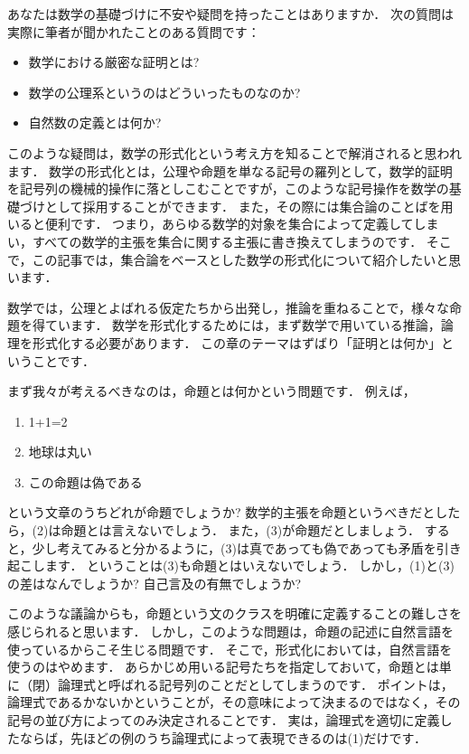 \documentclass[./main]{subfiles}
\begin{document}


あなたは数学の基礎づけに不安や疑問を持ったことはありますか．
次の質問は実際に筆者が聞かれたことのある質問です：
\begin{itemize}
\item 数学における厳密な証明とは?
\item 数学の公理系というのはどういったものなのか?
\item 自然数の定義とは何か?
\end{itemize}
このような疑問は，数学の形式化という考え方を知ることで解消されると思われます．
数学の形式化とは，公理や命題を単なる記号の羅列として，数学的証明を記号列の機械的操作に落としこむことですが，このような記号操作を数学の基礎づけとして採用することができます．
また，その際には集合論のことばを用いると便利です．
つまり，あらゆる数学的対象を集合によって定義してしまい，すべての数学的主張を集合に関する主張に書き換えてしまうのです．
そこで，この記事では，集合論をベースとした数学の形式化について紹介したいと思います．


数学では，公理とよばれる仮定たちから出発し，推論を重ねることで，様々な命題を得ています．
数学を形式化するためには，まず数学で用いている推論，論理を形式化する必要があります．
この章のテーマはずばり「証明とは何か」ということです．


まず我々が考えるべきなのは，命題とは何かという問題です．
例えば，
\begin{enumerate}
\item 1+1=2
\item 地球は丸い
\item この命題は偽である
\end{enumerate}
という文章のうちどれが命題でしょうか?
数学的主張を命題というべきだとしたら，(2)は命題とは言えないでしょう．
また，(3)が命題だとしましょう．
すると，少し考えてみると分かるように，(3)は真であっても偽であっても矛盾を引き起こします．
ということは(3)も命題とはいえないでしょう．
しかし，(1)と(3)の差はなんでしょうか?
自己言及の有無でしょうか?

このような議論からも，命題という文のクラスを明確に定義することの難しさを感じられると思います．
しかし，このような問題は，命題の記述に自然言語を使っているからこそ生じる問題です．
そこで，形式化においては，自然言語を使うのはやめます．
あらかじめ用いる記号たちを指定しておいて，命題とは単に（閉）論理式と呼ばれる記号列のことだとしてしまうのです．
ポイントは，論理式であるかないかということが，その意味によって決まるのではなく，その記号の並び方によってのみ決定されることです．
実は，論理式を適切に定義したならば，先ほどの例のうち論理式によって表現できるのは(1)だけです．
\end{document}

